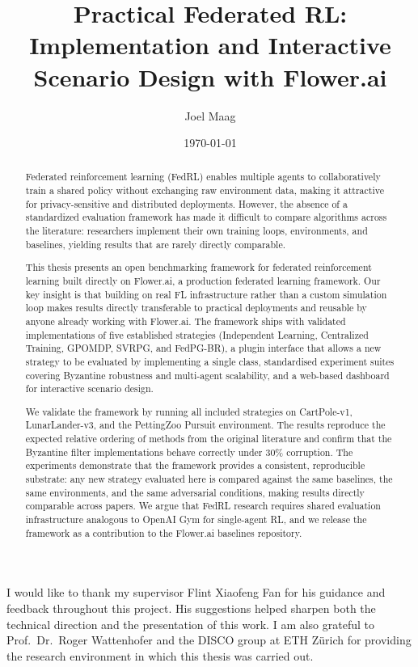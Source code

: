 \documentclass[a4paper, oneside]{discothesis}
\title{Practical Federated RL: Implementation and Interactive Scenario Design with Flower.ai}
\author{Joel Maag}
\institute{Distributed Computing Group \\[2pt]
Computer Engineering and Networks Laboratory \\[2pt]
ETH Zürich}
\date{\today}
\begin{document}
\frontmatter %
\maketitle

\cleardoublepage

\begin{acknowledgements}
I would like to thank my supervisor Flint Xiaofeng Fan for his guidance and feedback throughout this project. His suggestions helped sharpen both the technical direction and the presentation of this work. I am also grateful to Prof.\ Dr.\ Roger Wattenhofer and the DISCO group at ETH Zürich for providing the research environment in which this thesis was carried out.
\end{acknowledgements}


\begin{abstract}
Federated reinforcement learning (FedRL) enables multiple agents to collaboratively train a shared policy without exchanging raw environment data, making it attractive for privacy-sensitive and distributed deployments. However, the absence of a standardized evaluation framework has made it difficult to compare algorithms across the literature: researchers implement their own training loops, environments, and baselines, yielding results that are rarely directly comparable.

This thesis presents an open benchmarking framework for federated reinforcement learning built directly on Flower.ai, a production federated learning framework. Our key insight is that building on real FL infrastructure rather than a custom simulation loop makes results directly transferable to practical deployments and reusable by anyone already working with Flower.ai. The framework ships with validated implementations of five established strategies (Independent Learning, Centralized Training, GPOMDP, SVRPG, and FedPG-BR), a plugin interface that allows a new strategy to be evaluated by implementing a single class, standardised experiment suites covering Byzantine robustness and multi-agent scalability, and a web-based dashboard for interactive scenario design.

We validate the framework by running all included strategies on CartPole-v1, LunarLander-v3, and the PettingZoo Pursuit environment. The results reproduce the expected relative ordering of methods from the original literature and confirm that the Byzantine filter implementations behave correctly under 30\% corruption. The experiments demonstrate that the framework provides a consistent, reproducible substrate: any new strategy evaluated here is compared against the same baselines, the same environments, and the same adversarial conditions, making results directly comparable across papers. We argue that FedRL research requires shared evaluation infrastructure analogous to OpenAI Gym for single-agent RL, and we release the framework as a contribution to the Flower.ai baselines repository.
\end{abstract}
\end{document}

